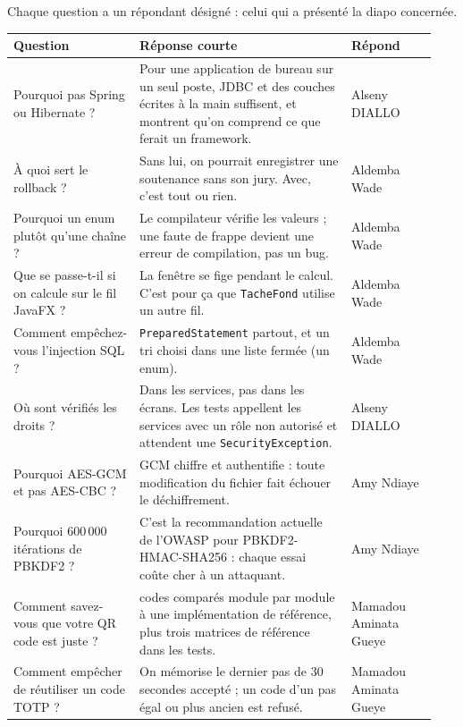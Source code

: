 \documentclass[11pt,a4paper]{article}
\begin{document}
Chaque question a un répondant désigné : celui qui a présenté la diapo concernée.

\vspace{4pt}
\begin{longtable}{@{}>{\raggedright\arraybackslash}p{0.28\linewidth}>{\raggedright\arraybackslash}p{0.47\linewidth}>{\raggedright\arraybackslash}p{0.19\linewidth}@{}}
  \toprule
  \textbf{Question} & \textbf{Réponse courte} & \textbf{Répond} \\
  \midrule
  \endhead
  Pourquoi pas Spring ou Hibernate ? & Pour une application de bureau sur un seul poste, JDBC et des couches
    écrites à la main suffisent, et montrent qu'on comprend ce que ferait un framework. & Alseny DIALLO \\
  À quoi sert le rollback ? & Sans lui, on pourrait enregistrer une soutenance sans son jury. Avec, c'est
    tout ou rien. & Aldemba Wade \\
  Pourquoi un enum plutôt qu'une chaîne ? & Le compilateur vérifie les valeurs ; une faute de frappe devient
    une erreur de compilation, pas un bug. & Aldemba Wade \\
  Que se passe-t-il si on calcule sur le fil JavaFX ? & La fenêtre se fige pendant le calcul. C'est pour ça
    que \texttt{TacheFond} utilise un autre fil. & Aldemba Wade \\
  Comment empêchez-vous l'injection SQL ? & \texttt{PreparedStatement} partout, et un tri choisi dans une
    liste fermée (un enum). & Aldemba Wade \\
  Où sont vérifiés les droits ? & Dans les services, pas dans les écrans. Les tests appellent les services
    avec un rôle non autorisé et attendent une \texttt{SecurityException}. & Alseny DIALLO \\
  Pourquoi AES-GCM et pas AES-CBC ? & GCM chiffre et authentifie : toute modification du fichier fait échouer
    le déchiffrement. & Amy Ndiaye \\
  Pourquoi 600\,000 itérations de PBKDF2 ? & C'est la recommandation actuelle de l'OWASP pour
    PBKDF2-HMAC-SHA256 : chaque essai coûte cher à un attaquant. & Amy Ndiaye \\
  Comment savez-vous que votre QR code est juste ? & 67 codes comparés module par module à une
    implémentation de référence, plus trois matrices de référence dans les tests. & Mamadou Aminata Gueye \\
  Comment empêcher de réutiliser un code TOTP ? & On mémorise le dernier pas de 30 secondes accepté ; un code
    d'un pas égal ou plus ancien est refusé. & Mamadou Aminata Gueye \\
  \bottomrule
\end{longtable}
\end{document}
